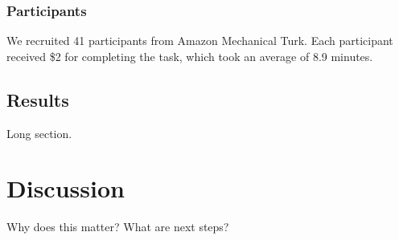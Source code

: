 \documentclass[10pt,letterpaper]{article}
\begin{document}
\subsubsection{Participants}
We recruited 41 participants from Amazon Mechanical Turk. Each participant received \$2 for completing the task, which took an average of 8.9 minutes.

\subsection{Results}
Long section.


\section{Discussion}
Why does this matter? What are next steps?



\setlength{\bibleftmargin}{.125in}
\setlength{\bibindent}{-\bibleftmargin}


\end{document}
